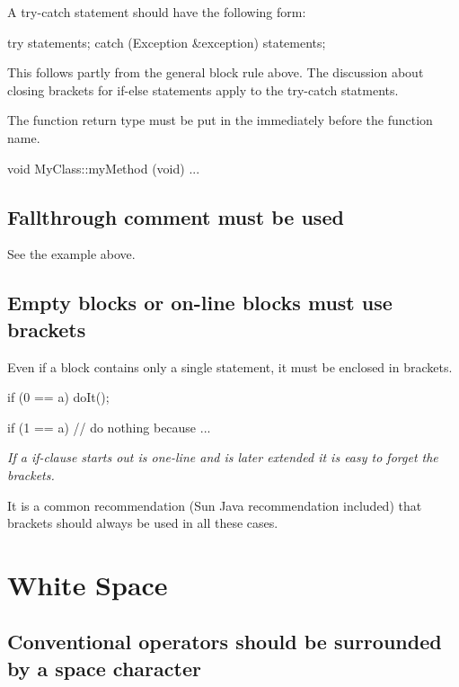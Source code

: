 \documentclass[a4paper,11pt,oneside]{scrbook}
\newcommand{\guideline}[1]{{\subsection{#1}}}
\newcommand{\motivation}[1]{{\normalfont \itshape #1}}
\newcommand{\trcode}[1]{{\normalfont \ttfamily #1}}
\begin{document}
A \trcode{try-catch} statement should have the following form: 

\begin{code}
  try {
    statements;
  }
  catch (Exception &exception) {
    statements;
  }
\end{code}

This follows partly from the general block rule above. The discussion about
closing brackets for \trcode{if-else} statements apply to the \trcode{try-catch}
statments.

The function return type must be put in the immediately before the function
name.

\begin{code}
  void MyClass::myMethod (void) {
    ...
  } 
\end{code}

\guideline{Fallthrough comment must be used}

See the example above.

\guideline{Empty blocks or on-line blocks must use brackets}

Even if a block contains only a single statement, it must be enclosed in
brackets.

\begin{code}
  if (0 == a) {
    doIt();
  }

  if (1 == a) {
    // do nothing because ...
  }
\end{code}

\motivation{
   If a if-clause starts out is one-line and is later extended it is easy to forget
   the brackets.

  It is a common recommendation (Sun Java recommendation included) that
  brackets should always be used in all these cases.
}

\section{White Space}

\guideline{Conventional operators should be surrounded by a space character}
\end{document}

